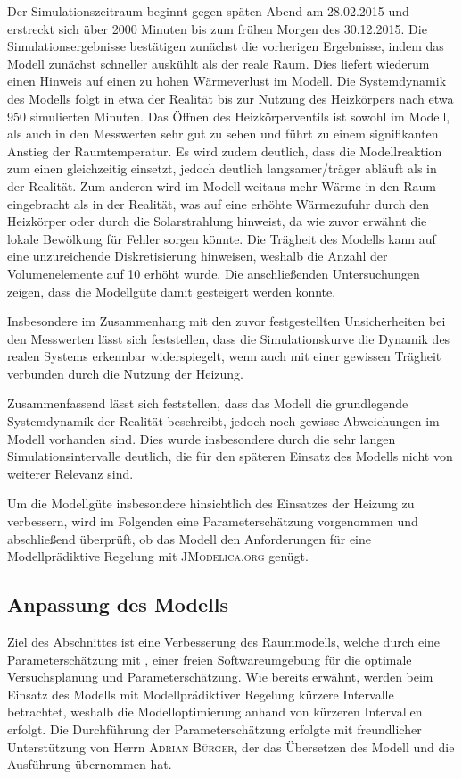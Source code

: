 Der Simulationszeitraum beginnt gegen späten Abend am 28.02.2015 und erstreckt sich über 2000 Minuten bis zum frühen Morgen des 30.12.2015. Die Simulationsergebnisse bestätigen zunächst die vorherigen Ergebnisse, indem das Modell zunächst schneller auskühlt als der reale Raum. Dies liefert wiederum einen Hinweis auf einen zu hohen Wärmeverlust im Modell.
Die Systemdynamik des Modells folgt in etwa der Realität bis zur Nutzung des Heizkörpers nach etwa 950 simulierten Minuten. 
Das Öffnen des Heizkörperventils ist sowohl im Modell, als auch in den Messwerten sehr gut zu sehen und führt zu einem signifikanten Anstieg der Raumtemperatur. Es wird zudem deutlich, dass die Modellreaktion zum einen gleichzeitig einsetzt, jedoch deutlich langsamer/träger abläuft als in der Realität. Zum anderen wird im Modell weitaus mehr Wärme in den Raum eingebracht als in der Realität, was auf eine erhöhte Wärmezufuhr durch den Heizkörper oder durch die Solarstrahlung hinweist, da wie zuvor erwähnt die lokale Bewölkung für Fehler sorgen könnte.
Die Trägheit des Modells kann auf eine unzureichende Diskretisierung hinweisen, weshalb die Anzahl der Volumenelemente auf 10 erhöht wurde. Die anschließenden Untersuchungen zeigen, dass die Modellgüte damit gesteigert werden konnte.

Insbesondere im Zusammenhang mit den zuvor festgestellten Unsicherheiten bei den Messwerten lässt sich feststellen, dass die  Simulationskurve die Dynamik des realen Systems erkennbar widerspiegelt, wenn auch mit einer gewissen Trägheit verbunden durch die Nutzung der Heizung.

Zusammenfassend lässt sich feststellen, dass das Modell die grundlegende Systemdynamik der Realität beschreibt, jedoch noch gewisse Abweichungen im Modell vorhanden sind. Dies wurde insbesondere durch die sehr langen Simulationsintervalle deutlich, die für den späteren Einsatz des Modells nicht von weiterer Relevanz sind.

 Um die Modellgüte insbesondere hinsichtlich des Einsatzes der Heizung zu verbessern, wird im Folgenden eine Parameterschätzung vorgenommen und abschließend überprüft, ob das Modell den Anforderungen für eine Modellprädiktive Regelung mit \textsc{JModelica.org} genügt.


\subsection{Anpassung des Modells}
Ziel des Abschnittes ist eine Verbesserung des Raummodells, welche durch eine Parameterschätzung mit \cite{casiopeia}, einer freien Softwareumgebung für die optimale Versuchsplanung und Parameterschätzung.
Wie bereits erwähnt, werden beim Einsatz des Modells mit Modellprädiktiver Regelung kürzere Intervalle betrachtet, weshalb die Modelloptimierung anhand von kürzeren Intervallen erfolgt. Die Durchführung der Parameterschätzung erfolgte mit freundlicher Unterstützung von Herrn \textsc{Adrian Bürger}, der das Übersetzen des Modell und die Ausführung übernommen hat.

